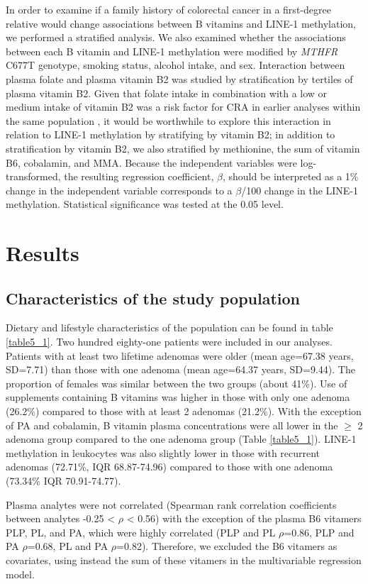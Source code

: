 \noindent In order to examine if a family history of colorectal cancer in a first-degree relative would change associations between B vitamins and LINE-1 methylation, we performed a stratified analysis. We also examined whether the associations between each B vitamin and LINE-1 methylation were modified by \emph{MTHFR} C677T genotype, smoking status, alcohol intake, and sex. Interaction between plasma folate and plasma vitamin B2 was studied by stratification by tertiles of plasma vitamin B2. Given that folate intake in combination with a low or medium intake of vitamin B2 was a risk factor for CRA in earlier analyses within the same population \cite{c525}, it would be worthwhile to explore this interaction in relation to LINE-1 methylation by stratifying by vitamin B2; in addition to stratification by vitamin B2, we also stratified by methionine, the sum of vitamin B6, cobalamin, and MMA. Because the independent variables were log-transformed, the resulting regression coefficient, $\beta$, should be interpreted as a 1\% change in the independent variable corresponds to a $\beta$/100 change in the LINE-1 methylation. Statistical significance was tested at the 0.05 level.

\section{Results} %
\subsection{Characteristics of the study population} %
\noindent Dietary and lifestyle characteristics of the population can be found in table \ref{table5_1}. Two hundred eighty-one patients were included in our analyses. Patients with at least two lifetime adenomas were older (mean age=67.38 years, SD=7.71) than those with one adenoma (mean age=64.37 years, SD=9.44). The proportion of females was similar between the two groups (about 41\%). Use of supplements containing B vitamins was higher in those with only one adenoma (26.2\%) compared to those with at least 2 adenomas (21.2\%). With the exception of PA and cobalamin, B vitamin plasma concentrations were all lower in the $\geq$ 2 adenoma group compared to the one adenoma group (Table \ref{table5_1}). LINE-1 methylation in leukocytes was also slightly lower in those with recurrent adenomas (72.71\%, IQR 68.87-74.96) compared to those with one adenoma (73.34\% IQR 70.91-74.77).

\noindent Plasma analytes were not correlated (Spearman rank correlation coefficients between analytes -0.25 < $\rho$ < 0.56) with the exception of the plasma B6 vitamers PLP, PL, and PA, which were highly correlated (PLP and PL $\rho$=0.86, PLP and PA $\rho$=0.68, PL and PA $\rho$=0.82). Therefore, we excluded the B6 vitamers as covariates, using instead the sum of these vitamers in the multivariable regression model.

